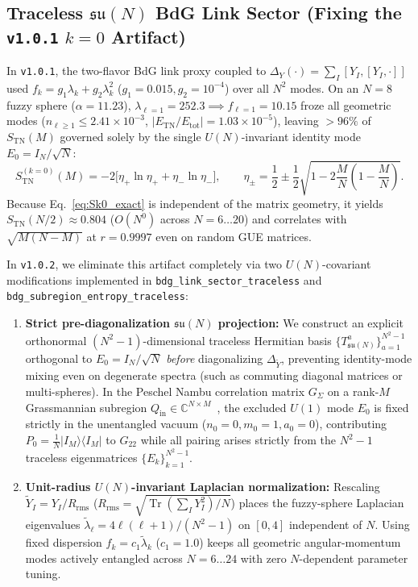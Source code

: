 \documentclass[11pt,a4paper]{article}
\DeclareMathOperator{\Tr}{Tr}
\begin{document}
\subsection{Traceless $\mathfrak{su}(N)$ BdG Link Sector (Fixing the \texttt{v1.0.1} $k=0$ Artifact)}
\label{sec:traceless_bdg}

In \texttt{v1.0.1}, the two-flavor BdG link proxy coupled to $\Delta_Y(\cdot) = \sum_I [Y_I,[Y_I,\cdot]]$ used $f_k = g_1\lambda_k + g_2\lambda_k^2$ ($g_1=0.015, g_2=10^{-4}$) over all $N^2$ modes. On an $N=8$ fuzzy sphere ($\alpha = 11.23$), $\lambda_{\ell=1} = 252.3 \implies f_{\ell=1} = 10.15$ froze all geometric modes ($n_{\ell\ge 1} \le 2.41\times 10^{-3}$, $|E_{\mathrm{TN}}/E_{\mathrm{tot}}| = 1.03\times 10^{-5}$), leaving $>96\%$ of $S_{\mathrm{TN}}(M)$ governed solely by the single $U(N)$-invariant identity mode $E_0 = I_N/\sqrt{N}$:
\begin{equation}
  S_{\mathrm{TN}}^{(k=0)}(M) = -2\bigl[\eta_+\ln\eta_+ + \eta_-\ln\eta_-\bigr],
  \qquad
  \eta_\pm = \frac{1}{2} \pm \frac{1}{2}\sqrt{1 - 2\frac{M}{N}\!\left(1 - \frac{M}{N}\right)}.
  \label{eq:Sk0_exact}
\end{equation}
Because Eq.~\eqref{eq:Sk0_exact} is independent of the matrix geometry, it yields $S_{\mathrm{TN}}(N/2) \approx 0.804$ ($O(N^0)$ across $N=6\dots 20$) and correlates with $\sqrt{M(N-M)}$ at $r = 0.9997$ even on random GUE matrices.

In \texttt{v1.0.2}, we eliminate this artifact completely via two $U(N)$-covariant modifications implemented in \texttt{bdg\_link\_sector\_traceless} and \texttt{bdg\_subregion\_entropy\_traceless}:
\begin{enumerate}
  \item \textbf{Strict pre-diagonalization $\mathfrak{su}(N)$ projection:} We construct an explicit orthonormal $(N^2-1)$-dimensional traceless Hermitian basis $\{T^a_{\mathfrak{su}(N)}\}_{a=1}^{N^2-1}$ orthogonal to $E_0 = I_N/\sqrt{N}$ \emph{before} diagonalizing $\Delta_{\tilde{Y}}$, preventing identity-mode mixing even on degenerate spectra (such as commuting diagonal matrices or multi-spheres). In the Peschel Nambu correlation matrix $G_\Sigma$ on a rank-$M$ Grassmannian subregion $Q_{\mathrm{in}} \in \mathbb{C}^{N\times M}$~\cite{Peschel2003,Fliss2025}, the excluded $U(1)$ mode $E_0$ is fixed strictly in the unentangled vacuum ($n_0=0, m_0=1, a_0=0$), contributing $P_0 = \frac{1}{N}|I_M\rangle\langle I_M|$ to $G_{22}$ while all pairing arises strictly from the $N^2-1$ traceless eigenmatrices $\{E_k\}_{k=1}^{N^2-1}$.
  \item \textbf{Unit-radius $U(N)$-invariant Laplacian normalization:} Rescaling $\tilde{Y}_I = Y_I / R_{\mathrm{rms}}$ ($R_{\mathrm{rms}} = \sqrt{\Tr(\sum_I Y_I^2)/N}$) places the fuzzy-sphere Laplacian eigenvalues $\tilde{\lambda}_\ell = 4\ell(\ell+1)/(N^2-1)$ on $[0, 4]$ independent of $N$. Using fixed dispersion $f_k = c_1 \tilde{\lambda}_k$ ($c_1 = 1.0$) keeps all geometric angular-momentum modes actively entangled across $N = 6 \dots 24$ with zero $N$-dependent parameter tuning.
\end{enumerate}
\end{document}

